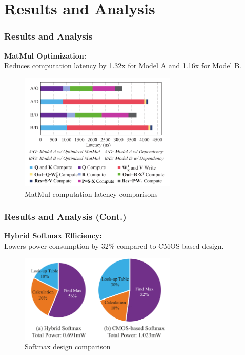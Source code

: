 \documentclass[
	12pt, %
]{beamer}
\begin{document}
\section{Results and Analysis}
\begin{frame}
	\frametitle{Results and Analysis}
	\textbf{MatMul Optimization:}\\
	Reduces computation latency by 1.32x for Model A and 1.16x for Model B.
	
	\begin{figure}
		\includegraphics[width=7.5cm]{Images/img6.png}
		\caption{MatMul computation latency comparisons}
	\end{figure}
\end{frame}



\begin{frame}
	\frametitle{Results and Analysis (Cont.)}
	\textbf{Hybrid Softmax Efficiency:}\\
	Lowers power consumption by 32\% compared to CMOS-based design.
	
	\begin{figure}
		\includegraphics[width=7.5cm]{Images/img7.png}
		\caption{Softmax design comparison}
	\end{figure}
\end{frame}
\end{document}
